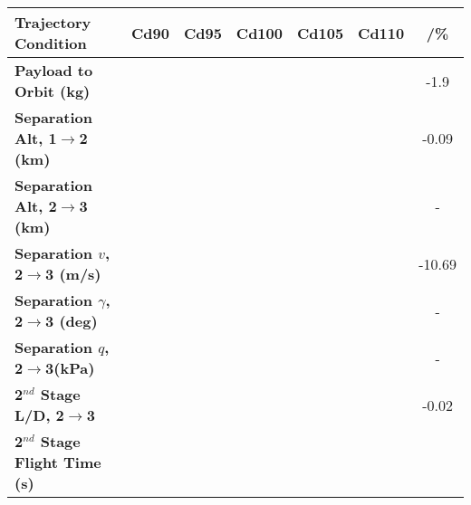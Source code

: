 \begin{tabular}{l c c c c c c} 
	\hline \textbf{Trajectory Condition}
	&Cd90
	&Cd95
	&Cd100
	&Cd105
	&Cd110
	& /\%
	\\
	\hline \textbf{Payload to Orbit (kg)}
	& \PayloadToOrbitCdNinetyNoReturn
	& \PayloadToOrbitCdNinetyFiveNoReturn
	& \PayloadToOrbitCdStandardNoReturn
	& \PayloadToOrbitCdOneHundredFiveNoReturn
	& \PayloadToOrbitCdOneHundredTenNoReturn
	&-1.9
	\\
	\textbf{Separation Alt, 1$\rightarrow$2 (km)}
	& \firstsecondSeparationAltCdNinetyNoReturn
	& \firstsecondSeparationAltCdNinetyFiveNoReturn
	& \firstsecondSeparationAltCdStandardNoReturn
	& \firstsecondSeparationAltCdOneHundredFiveNoReturn
	& \firstsecondSeparationAltCdOneHundredTenNoReturn
	&-0.09
	\\
	\textbf{Separation Alt, 2$\rightarrow$3 (km)}
	& \secondthirdSeparationAltCdNinetyNoReturn
	& \secondthirdSeparationAltCdNinetyFiveNoReturn
	& \secondthirdSeparationAltCdStandardNoReturn
	& \secondthirdSeparationAltCdOneHundredFiveNoReturn
	& \secondthirdSeparationAltCdOneHundredTenNoReturn
	& -
	\\
	\textbf{Separation $v$, 2$\rightarrow$3 (m/s)}
	& \secondthirdSeparationvCdNinetyNoReturn
	& \secondthirdSeparationvCdNinetyFiveNoReturn
	& \secondthirdSeparationvCdStandardNoReturn
	& \secondthirdSeparationvCdOneHundredFiveNoReturn
	& \secondthirdSeparationvCdOneHundredTenNoReturn
	&-10.69
	\\
	\textbf{Separation $\gamma$, 2$\rightarrow$3 (deg)}
	& \secondthirdSeparationgammaCdNinetyNoReturn
	& \secondthirdSeparationgammaCdNinetyFiveNoReturn
	& \secondthirdSeparationgammaCdStandardNoReturn
	& \secondthirdSeparationgammaCdOneHundredFiveNoReturn
	& \secondthirdSeparationgammaCdOneHundredTenNoReturn
	& -
	\\
	\textbf{Separation $q$, 2$\rightarrow$3(kPa)}
	& \secondthirdSeparationqCdNinetyNoReturn
	& \secondthirdSeparationqCdNinetyFiveNoReturn
	& \secondthirdSeparationqCdStandardNoReturn
	& \secondthirdSeparationqCdOneHundredFiveNoReturn
	& \secondthirdSeparationqCdOneHundredTenNoReturn
	& -
	\\
	\textbf{2$^{nd}$ Stage L/D, 2$\rightarrow$3}
	& \secondthirdSeparationLDCdNinetyNoReturn
	& \secondthirdSeparationLDCdNinetyFiveNoReturn
	& \secondthirdSeparationLDCdStandardNoReturn
	& \secondthirdSeparationLDCdOneHundredFiveNoReturn
	& \secondthirdSeparationLDCdOneHundredTenNoReturn
	&-0.02
	\\
	\textbf{2$^{nd}$ Stage Flight Time (s)}
	& \secondFlightTimeCdNinetyNoReturn

\end{tabular}
